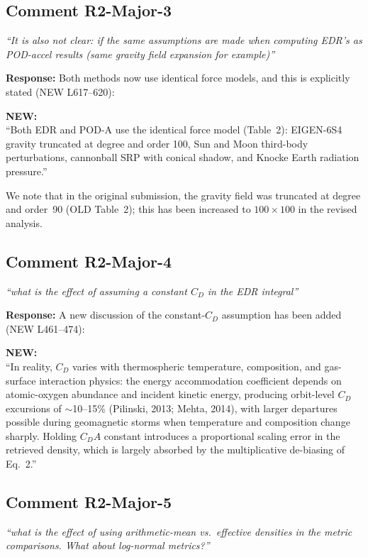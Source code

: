 \documentclass[11pt]{article}
\newcommand{\reviewercomment}[1]{%
  \medskip
  \noindent\textit{\color{reviewblue}#1}%
  \medskip
}
\newcommand{\newtext}[1]{%
  \smallskip
  \noindent\hspace{1em}\begin{minipage}{0.92\textwidth}%
  \color{quotegreen}\textbf{NEW:}\\[2pt]``#1''%
  \end{minipage}%
  \smallskip
}
\begin{document}
\subsection{Comment R2-Major-3}

\reviewercomment{%
``It is also not clear: if the same assumptions are made when computing EDR's as POD-accel results (same gravity field expansion for example)''}

\textbf{Response:}
Both methods now use identical force models, and this is explicitly stated (NEW L617--620):

\newtext{Both EDR and POD-A use the identical force model (Table~2): EIGEN-6S4 gravity truncated at degree and order 100, Sun and Moon third-body perturbations, cannonball SRP with conical shadow, and Knocke Earth radiation pressure.}

We note that in the original submission, the gravity field was truncated at degree and order~90 (OLD Table~2); this has been increased to $100\times100$ in the revised analysis.


\subsection{Comment R2-Major-4}

\reviewercomment{%
``what is the effect of assuming a constant $C_D$ in the EDR integral''}

\textbf{Response:}
A new discussion of the constant-$C_D$ assumption has been added (NEW L461--474):

\newtext{In reality, $C_D$ varies with thermospheric temperature, composition, and gas-surface interaction physics: the energy accommodation coefficient depends on atomic-oxygen abundance and incident kinetic energy, producing orbit-level $C_D$ excursions of ${\sim}$10--15\% (Pilinski, 2013; Mehta, 2014), with larger departures possible during geomagnetic storms when temperature and composition change sharply. Holding $C_D A$ constant introduces a proportional scaling error in the retrieved density, which is largely absorbed by the multiplicative de-biasing of Eq.~2.}


\subsection{Comment R2-Major-5}

\reviewercomment{%
``what is the effect of using arithmetic-mean vs.\ effective densities in the metric comparisons. What about log-normal metrics?''}
\end{document}
